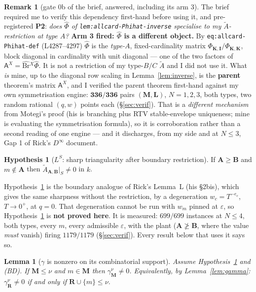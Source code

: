 \documentclass[11pt]{article}
\newtheorem{lem}[thm]{Lemma}
\theoremstyle{definition}
\newtheorem{rem}[thm]{Remark}
\newtheorem{hyp}[thm]{Hypothesis}
\newcommand{\At}{\widetilde{A}}
\newcommand{\bM}{\mathbf{M}}
\newcommand{\bI}{\mathbf{I}}
\newcommand{\bA}{\mathbf{A}}
\newcommand{\bB}{\mathbf{B}}
\newcommand{\bR}{\mathbf{R}}
\newcommand{\bK}{\mathbf{K}}
\begin{document}
\begin{rem}[gate 0b of the brief, answered, including its arm 3]\label{rem:gate}
The brief required me to verify this dependency first-hand before using it, and
pre-registered \textbf{P2}: \emph{does $\widehat\Phi$ of
\texttt{lem:allcard-Phihat-inverse} specialise to my $\At$-restriction at type
$A$?}  \textbf{Arm 3 fired: $\widehat\Phi$ is a different object.}  By
\texttt{eq:allcard-Phihat-def} (L4287--4297) $\widehat\Phi$ is the \emph{type-$A$},
fixed-cardinality matrix $\Phi_{\bK,\bI}/\Phi_{\bK,\bK}$, block diagonal in
cardinality with unit diagonal --- one of the two factors of
$\mathsf A^{X}=\widehat{\mathrm{Br}}{}^{X}\widehat\Phi$.  It is not a
restriction of my type-$B/C$ $\At$ and I did not use it.  What \emph{is} mine, up
to the diagonal row scaling in Lemma~\ref{lem:inverse}, is the \textbf{parent}
theorem's matrix $\mathsf A^{X}$, and I verified the parent theorem first-hand
against my own symmetrisation engine: $\mathbf{336/336}$ pairs $(\bM,\mathbf L)$,
$N=1,2,3$, both types, two random rational $(q,w)$ points each
(\S\ref{sec:verif}).  That is a \emph{different mechanism} from Motegi's proof
(his is branching plus RTV stable-envelope uniqueness; mine is evaluating the
symmetrisation formula), so it is corroboration rather than a second reading of
one engine --- and it discharges, from my side and at $N\le3$, Gap 1 of Rick's
$D^\infty$ document.
\end{rem}

\begin{hyp}[$L^{S}$: sharp triangularity after boundary restriction]\label{hyp:L}
If $\bA\ge\bB$ and $m\notin\bA$ then $\At_{\bA,\bB}\big|_{S}\ne0$ in $k$.
\end{hyp}

\noindent
Hypothesis~\ref{hyp:L} is the boundary analogue of Rick's Lemma~L (his \S2bis),
which gives the same sharpness without the restriction, by a degeneration
$w_c=T^{-e_c}$, $T\to0^{+}$, at $q=0$.  That degeneration cannot be run with
$w_m$ pinned at $\varepsilon$, so Hypothesis~\ref{hyp:L} is \textbf{not proved
here}.  It is measured: $699/699$ instances at $N\le4$, both types, every $m$,
every admissible $\varepsilon$, with the plant ($\bA\not\ge\bB$, where the value
\emph{must} vanish) firing $1179/1179$ (\S\ref{sec:verif}).  Every result below
that uses it says so.

\begin{lem}[$\gamma$ is nonzero on its combinatorial support]\label{lem:gnz}
Assume Hypothesis~\ref{hyp:L} and \textup{(BD)}.  If $\bM\le\nu$ and $m\in\bM$
then $\gamma^{\nu}_{\bM}\ne0$.  Equivalently, by Lemma~\ref{lem:gamma}:
$\gamma^{\nu}_{\bR}\ne0$ if and only if $\bR\cup\{m\}\le\nu$.
\end{lem}
\end{document}
